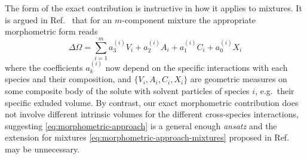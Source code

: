 \documentclass[11pt,twoside]{report}
\begin{document}
The form of the exact contribution is instructive in how it applies to mixtures.
It is argued in Ref.\ \cite{KodamaJCP2011} that for an $m$-component mixture the appropriate morphometric form reads
\begin{equation}\label{eq:morphometric-approach-mixtures}
  \Delta \Omega
  =
  \sum_{i=1}^m
  a_3^{(i)} V_i
  + a_2^{(i)} A_i
  + a_1^{(i)} C_i
  + a_0^{(i)} X_i
\end{equation}
where the coefficients $a_k^{(i)}$ now depend on the specific interactions with each species and their composition, and $\{V_i, A_i, C_i, X_i\}$ are geometric measures on some composite body of the solute with solvent particles of species $i$, e.g.\ their specific exluded volume.
By contrast, our exact morphometric contribution does not involve different intrinsic volumes for the different cross-species interactions, suggesting \eqref{eq:morphometric-approach} is a general enough \emph{ansatz} and the extension for mixtures \eqref{eq:morphometric-approach-mixtures} proposed in Ref.\ \cite{KodamaJCP2011} may be unnecessary.
\end{document}
